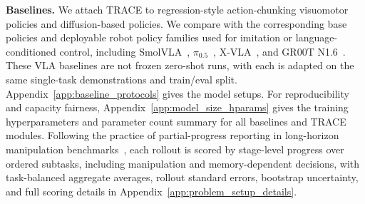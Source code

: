 \documentclass{article}
\begin{document}

\textbf{Baselines.}
We attach TRACE to regression-style action-chunking visuomotor policies and diffusion-based policies. We compare with the corresponding base policies and deployable robot policy families used for imitation or language-conditioned control, including SmolVLA~\citep{shukor2025smolvla}, $\pi_{0.5}$~\citep{black2024pi0}, X-VLA~\citep{zheng2025xvla}, and GR00T N1.6~\citep{nvidia2025gr00tn1}. These VLA baselines are not frozen zero-shot runs, with each is adapted on the same single-task demonstrations and train/eval split. Appendix~\ref{app:baseline_protocols} gives the model setups. For reproducibility and capacity fairness, Appendix~\ref{app:model_size_hparams} gives the training hyperparameters and parameter count summary for all baselines and TRACE modules. Following the practice of partial-progress reporting in long-horizon manipulation benchmarks~\citep{heo2023furniturebench,mees2022calvin}, each rollout is scored by stage-level progress over ordered subtasks, including manipulation and memory-dependent decisions, with task-balanced aggregate averages, rollout standard errors, bootstrap uncertainty, and full scoring details in Appendix~\ref{app:problem_setup_details}.
\end{document}

